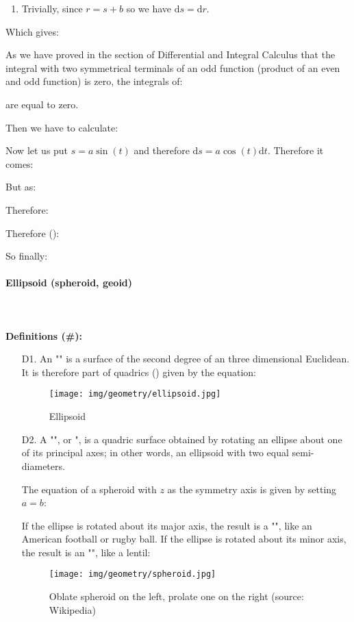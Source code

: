 {\begin{enumerate}
		\item Trivially, since $r=s+b$ so we have $\mathrm{d}s=\mathrm{d}r$.
	\end{enumerate}
	Which gives:
	
	As we have proved in the section of Differential and Integral Calculus that the integral with two symmetrical terminals of an odd function (product of an even and odd function) is zero, the integrals of:
	
	are equal to zero.

	Then we have to calculate:
	
	Now let us put $s=a\sin(t)$ and therefore $\mathrm{d}s=a\cos(t)\mathrm{d}t$. Therefore it comes:
	
	But as:
	
	Therefore:
	
	Therefore ():
	
	So finally:
	
	
	\paragraph{Ellipsoid (spheroid, geoid)}\mbox{}\\\\
	\textbf{Definitions (\#\mydef):}
	\begin{enumerate}
		\item[D1.] An "" is a surface of the second degree of an three dimensional Euclidean. It is therefore part of quadrics () given by the equation:
		
		\begin{figure}[H]
			\centering
			\texttt{[image: img/geometry/ellipsoid.jpg]}
			\caption{Ellipsoid}
		\end{figure}

		\item[D2.] A "", or ", is a quadric surface obtained by rotating an ellipse about one of its principal axes; in other words, an ellipsoid with two equal semi-diameters.
		
	The equation of a spheroid with $z$ as the symmetry axis is given by setting $a = b$:
	

	If the ellipse is rotated about its major axis, the result is a "", like an American football or rugby ball. If the ellipse is rotated about its minor axis, the result is an "", like a lentil:
		\begin{figure}[H]
			\centering
			\texttt{[image: img/geometry/spheroid.jpg]}
			\caption[Oblate spheroid on the left, prolate one on the right]{Oblate spheroid on the left, prolate one on the right (source: Wikipedia)}
		\end{figure}
	\end{enumerate}

}
